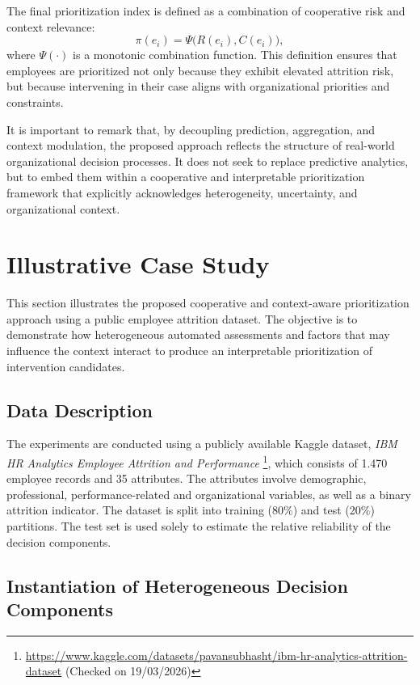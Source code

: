 \documentclass[runningheads]{llncs}
\begin{document}
The final prioritization index is defined as a combination of cooperative risk and context relevance:
\[
\pi(e_i) = \Psi\big(R(e_i), C(e_i)\big),
\]
where $\Psi(\cdot)$ is a monotonic combination function. This definition ensures that employees are prioritized not only because they exhibit elevated attrition risk, but because intervening in their case aligns with organizational priorities and constraints.

It is important to remark that, by decoupling prediction, aggregation, and context modulation, the proposed approach reflects the structure of real-world organizational decision processes.
It does not seek to replace predictive analytics, but to embed them within a cooperative and interpretable prioritization framework that explicitly acknowledges heterogeneity, uncertainty, and organizational context.

\section{Illustrative Case Study}\label{sec:illustrative}

This section illustrates the proposed cooperative and context-aware prioritization approach using a public employee attrition dataset.
The objective is to demonstrate how heterogeneous automated assessments and factors that may influence the context interact to produce an interpretable prioritization of intervention candidates.

\subsection{Data Description}

The experiments are conducted using a publicly available Kaggle dataset, \textit{IBM HR Analytics Employee Attrition and Performance}
\footnote{\url{https://www.kaggle.com/datasets/pavansubhasht/ibm-hr-analytics-attrition-dataset} (Checked on 19/03/2026)}, which consists of 1.470 employee records and 35 attributes. The attributes involve demographic, professional, performance-related and organizational variables, as well as a binary attrition indicator. The dataset is split into training (80\%) and test (20\%) partitions. The test set is used solely to estimate the relative reliability of the decision components.

\subsection{Instantiation of Heterogeneous Decision Components}
\end{document}
